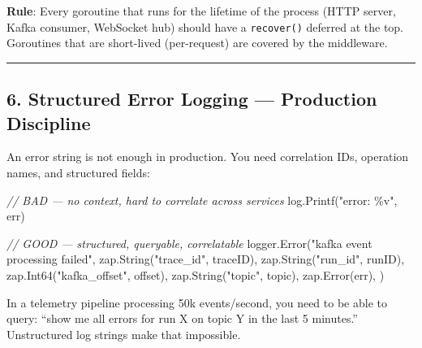 \documentclass[
]{article}
\newenvironment{Shaded}{}{}
\newcommand{\CommentTok}[1]{\textcolor[rgb]{0.38,0.63,0.69}{\textit{#1}}}
\newcommand{\NormalTok}[1]{#1}
\newcommand{\OperatorTok}[1]{\textcolor[rgb]{0.40,0.40,0.40}{#1}}
\newcommand{\StringTok}[1]{\textcolor[rgb]{0.25,0.44,0.63}{#1}}
\begin{document}
\textbf{Rule}: Every goroutine that runs for the lifetime of the process
(HTTP server, Kafka consumer, WebSocket hub) should have a
\texttt{recover()} deferred at the top. Goroutines that are short-lived
(per-request) are covered by the middleware.

\begin{center}\rule{0.5\linewidth}{0.5pt}\end{center}

\hypertarget{structured-error-logging-production-discipline}{%
\subsection{6. Structured Error Logging --- Production
Discipline}\label{structured-error-logging-production-discipline}}

An error string is not enough in production. You need correlation IDs,
operation names, and structured fields:

\begin{Shaded}
\begin{Highlighting}[]
\CommentTok{// BAD — no context, hard to correlate across services}
\NormalTok{log}\OperatorTok{.}\NormalTok{Printf}\OperatorTok{(}\StringTok{"error: \%v"}\OperatorTok{,}\NormalTok{ err}\OperatorTok{)}

\CommentTok{// GOOD — structured, queryable, correlatable}
\NormalTok{logger}\OperatorTok{.}\NormalTok{Error}\OperatorTok{(}\StringTok{"kafka event processing failed"}\OperatorTok{,}
\NormalTok{    zap}\OperatorTok{.}\NormalTok{String}\OperatorTok{(}\StringTok{"trace\_id"}\OperatorTok{,}\NormalTok{ traceID}\OperatorTok{),}
\NormalTok{    zap}\OperatorTok{.}\NormalTok{String}\OperatorTok{(}\StringTok{"run\_id"}\OperatorTok{,}\NormalTok{ runID}\OperatorTok{),}
\NormalTok{    zap}\OperatorTok{.}\NormalTok{Int64}\OperatorTok{(}\StringTok{"kafka\_offset"}\OperatorTok{,}\NormalTok{ offset}\OperatorTok{),}
\NormalTok{    zap}\OperatorTok{.}\NormalTok{String}\OperatorTok{(}\StringTok{"topic"}\OperatorTok{,}\NormalTok{ topic}\OperatorTok{),}
\NormalTok{    zap}\OperatorTok{.}\NormalTok{Error}\OperatorTok{(}\NormalTok{err}\OperatorTok{),}
\OperatorTok{)}
\end{Highlighting}
\end{Shaded}

In a telemetry pipeline processing 50k events/second, you need to be
able to query: ``show me all errors for run X on topic Y in the last 5
minutes.'' Unstructured log strings make that impossible.
\end{document}
